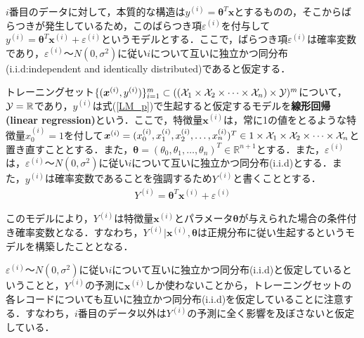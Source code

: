 $i$番目のデータに対して，本質的な構造は$y^{(i)}={\bm \theta}^T{\bm x}$とするものの，そこからばらつきが発生しているため，このばらつき項$\varepsilon^{(i)}$を付与して$y^{(i)}={\bm \theta}^T{\bm x}^{(i)}+\varepsilon^{(i)}$というモデルとする．ここで，ばらつき項$\varepsilon^{(i)}$は確率変数であり，$\varepsilon^{(i)}〜N(0,\sigma^2)$に従い$i$について互いに独立かつ同分布(i.i.d:independent and identically distributed)であると仮定する．

\begin{defi}
トレーニングセット$\{({\bm x}^{(i)},y^{(i)})\}_{i=1}^m \subset (({\cal X}_1 \times {\cal X}_2\times \cdots \times{\cal X}_n) \times {\cal Y})^m$について，${\cal Y}=\mathbb{R}$であり，$y^{(i)}$は式(\ref{LM_p})で生起すると仮定するモデルを{\bf 線形回帰(linear regression)}という．ここで，特徴量${\bm x}^{(i)}$は，常に1の値をとるような特徴量$x_0^{(i)}=1$を付して${\bm x}^{(i)}=(x_0^{(i)},x_1^{(i)},x_2^{(i)},\ldots,x_n^{(i)})^T \in 1 \times {\cal X}_1 \times {\cal X}_2\times \cdots \times{\cal X}_n$と置き直すこととする．また，${\bm \theta}=(\theta_0,\theta_1,\ldots,\theta_n)^T \in \mathbb{R}^{n+1}$とする．また，$\varepsilon^{(i)}$は，$\varepsilon^{(i)}〜N(0,\sigma^2)$に従い$i$について互いに独立かつ同分布(i.i.d)とする．また，$y^{(i)}$は確率変数であることを強調するため$Y^{(i)}$と書くこととする．
\begin{align}
Y^{(i)} = {\bm \theta}^T {\bm x}^{(i)}+\varepsilon^{(i)} \label{LM_p}
\end{align}
\end{defi}

このモデルにより，$Y^{(i)}$は特徴量${\bm x}^{(i)}$とパラメータ${\bm \theta}$が与えられた場合の条件付き確率変数となる．すなわち，$Y^{(i)}|{\bm x}^{(i)},{\bm \theta}$は正規分布に従い生起するというモデルを構築したこととなる．

\begin{rem}
$\varepsilon^{(i)}〜N(0,\sigma^2)$に従い$i$について互いに独立かつ同分布(i.i.d)と仮定しているということと，$Y^{(i)}$の予測に${\bm x}^{(i)}$しか使わないことから，トレーニングセットの各レコードについても互いに独立かつ同分布(i.i.d)を仮定していることに注意する．すなわち，$i$番目のデータ以外は$Y^{(i)}$の予測に全く影響を及ぼさないと仮定している．
\end{rem}

